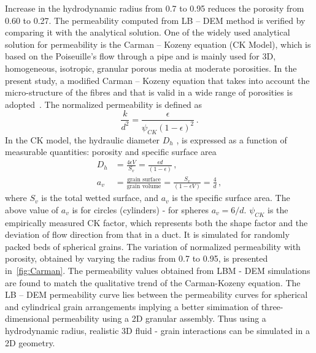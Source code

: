 Increase in the hydrodynamic radius from 0.7 to 0.95 reduces the porosity from 
0.60 to 0.27. The permeability computed from LB – DEM method is verified by 
comparing it with the analytical solution. One of the widely used analytical 
solution for permeability is the Carman – Kozeny equation (CK Model), 
which is based on the Poiseuille's flow through a pipe and is mainly used for 
3D, homogeneous, isotropic, granular porous media at moderate porosities. In 
the present study, a modified Carman – Kozeny equation that takes into account 
the micro-structure of the fibres and that is valid in a wide range of 
porosities is adopted~\citep{Yazdchi2011}. The normalized permeability is 
defined as
\begin{equation}
\frac{k}{d^2} = \frac{\epsilon}{\psi_{CK}(1-\epsilon)^2} \,.
\end{equation}
%
In the CK model, the hydraulic diameter $D_h$ , is expressed as a function of 
measurable quantities: porosity and specific surface area
%
\begin{align}
D_h & = \frac{4\epsilon V}{S_v}=\frac{\epsilon d}{(1 - \epsilon)} \,, \\
a_v & = \frac{\mbox{grain surface}}{\mbox{grain volume}} = 
\frac{S_v}{(1-\epsilon V)} = \frac{4}{d} \,,
\end{align}
%
where $S_v$ is the total wetted surface, and $a_v$ is the specific surface 
area. The above value of $a_v$ is for circles (cylinders) - for spheres $a_v = 
6/d$. $\psi_{CK}$ is the empirically  measured CK factor, which represents both 
the shape factor and the deviation of flow direction from that in a duct. It is 
simulated for randomly packed beds of spherical grains. The variation of 
normalized permeability with porosity, obtained by varying the radius from 0.7 
to 0.95, is presented in~\cref{fig:Carman}. The permeability values obtained 
from LBM - DEM simulations are found to match the qualitative trend of the 
Carman-Kozeny equation. The LB – DEM permeability curve lies between the 
permeability curves for spherical and cylindrical grain arrangements implying a 
better simimation of three-dimensional permeability using a 2D granular 
assembly. Thus using a hydrodynamic radius, realistic 3D fluid - grain 
interactions can be simulated in a 2D geometry.

